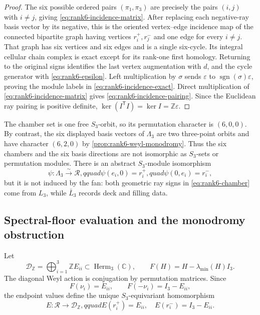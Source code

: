 \documentclass[11pt]{article}
\theoremstyle{definition}
\theoremstyle{remark}
\numberwithin{equation}{section}
\begin{document}
\begin{proof}
The six possible ordered pairs \((\pi_1,\pi_3)\) are precisely the pairs
\((i,j)\) with \(i\ne j\), giving \eqref{eq:rank6-incidence-matrix}.
After replacing each negative-ray basis vector by its negative, this is the
oriented vertex--edge incidence map of the connected bipartite graph having
vertices \(r_i^+,r_j^-\) and one edge for every \(i\ne j\).  That graph has
six vertices and six edges and is a single six-cycle.  Its integral cellular
chain complex is exact except for its rank-one first homology.  Returning to
the original signs identifies the last vertex augmentation with \(d\), and
the cycle generator with \eqref{eq:rank6-epsilon}.  Left multiplication by
\(\sigma\) sends \(\varepsilon\) to
\(\operatorname{sgn}(\sigma)\varepsilon\), proving the module labels in
\eqref{eq:rank6-incidence-exact}.  Direct multiplication of
\eqref{eq:rank6-incidence-matrix} gives
\eqref{eq:rank6-incidence-pairing}.  Since the Euclidean ray pairing is
positive definite, \(\ker(I^{\mathsf T}I)=\ker I=\mathbb Z\varepsilon\).
\end{proof}

The chamber set is one free \(S_3\)-orbit, so its permutation character is
\((6,0,0)\).  By contrast, the six displayed basis vectors of \(\Lambda_3\)
are two three-point orbits and have character \((6,2,0)\) by
\cref{prop:rank6-weyl-monodromy}.  Thus the six chambers and the six basis
directions are not isomorphic as \(S_3\)-sets or permutation modules.  There
is an abstract \(S_3\)-module isomorphism
\begin{equation}
 \psi:\Lambda_3\xrightarrow{\sim}\mathscr R,qquad
 \psi(e_i,0)=r_i^+,quad \psi(0,e_i)=r_i^-,             \label{eq:rank6-formal-ray-iso}
\end{equation}
but it is not induced by the fan: both geometric ray signs in
\eqref{eq:rank6-chamber} come from \(L_3\), while \(\bar L_3\) records deck
and filling data.

\subsection{Spectral-floor evaluation and the monodromy obstruction}

Let
\[
 \mathscr D_{\mathbb Z}=\bigoplus_{i=1}^3\mathbb ZE_{ii}
 \subset\operatorname{Herm}_3(\mathbb C),
 \qquad
 F(H)=H-\lambda_{\min}(H)I_3.
\]
The diagonal Weyl action is conjugation by permutation matrices.  Since
\[
 F(\nu_i)=E_{ii},\qquad F(-\nu_i)=I_3-E_{ii},
\]
the endpoint values define the unique \(S_3\)-equivariant homomorphism
\begin{equation}
 E:\mathscr R\longrightarrow\mathscr D_{\mathbb Z},qquad
 E(r_i^+)=E_{ii},\quad E(r_i^-)=I_3-E_{ii}.              \label{eq:rank6-ray-evaluation}
\end{equation}
\end{document}
